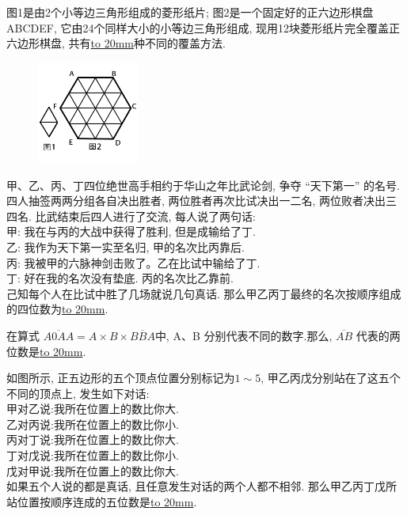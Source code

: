 \item {
    图1是由2个小等边三角形组成的菱形纸片; 图2是一个固定好的正六边形棋盘ABCDEF, 它由24个同样大小的小等边三角形组成, 现用12块菱形纸片完全覆盖正六边形棋盘, 共有\underline{\hbox to 20mm{}}种不同的覆盖方法.
    \begin{figure}[H] 
        \centering
        \includegraphics[width=0.3\textwidth]{./pics/Chapter_5/2015_2.png}
    \end{figure}
    \vspace{1cm}
}

\item {
    甲、乙、丙、丁四位绝世高手相约于华山之年比武论剑, 争夺 ``天下第一'' 的名号. 四人抽签两两分组各自决出胜者, 两位胜者再次比试决出一二名, 两位败者决出三四名. 比武结束后四人进行了交流, 每人说了两句话:\\
    甲: 我在与丙的大战中获得了胜利, 但是成输给了丁.\\
    乙: 我作为天下第一实至名归, 甲的名次比丙靠后.\\
    丙: 我被甲的六脉神剑击败了。乙在比试中输给了丁.\\
    丁: 好在我的名次没有垫底. 丙的名次比乙靠前.\\
    己知每个人在比试中胜了几场就说几句真话. 那么甲乙丙丁最终的名次按顺序组成的四位数为\underline{\hbox to 20mm{}}.
    \vspace{1cm}
}

\item {
    在算式 $\overline{A0AA}= A\times B\times \overline{BBA}$中, A、B 分别代表不同的数字.那么,  $\overline{AB}$ 代表的两位数是\underline{\hbox to 20mm{}}.
    \vspace{1cm}
}

\item {
    如图所示, 正五边形的五个顶点位置分别标记为$1\sim 5$, 甲乙丙戊分别站在了这五个不同的顶点上, 发生如下对话:\\
    甲对乙说:我所在位置上的数比你大. \\
    乙对丙说:我所在位置上的数比你小. \\
    丙对丁说:我所在位置上的数比你大. \\
    丁对戊说:我所在位置上的数比你小. \\
    戊对甲说:我所在位置上的数比你大. \\
    如果五个人说的都是真话, 且任意发生对话的两个人都不相邻. 那么甲乙丙丁戊所站位置按顺序连成的五位数是\underline{\hbox to 20mm{}}.
    \vspace{1cm}
}

